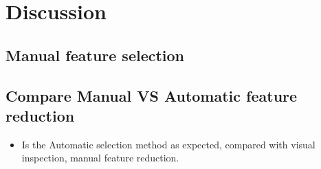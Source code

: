 \section{Discussion}

\subsection{Manual feature selection}








\subsection{Compare Manual VS Automatic feature reduction}
\begin{itemize}
    \item Is the Automatic selection method as expected, compared with visual
        inspection, manual feature reduction.   
\end{itemize}





